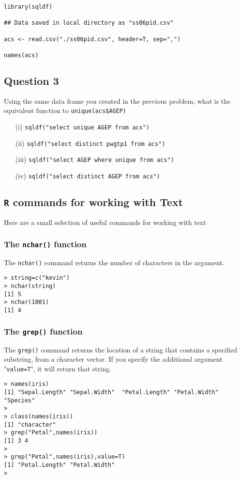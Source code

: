 \documentclass[12pt]{article}
\begin{document}
\begin{framed}
\begin{verbatim}
library(sqldf)

## Data saved in local directory as "ss06pid.csv"

acs <- read.csv("./ss06pid.csv", header=T, sep=",")

names(acs)
\end{verbatim}
\end{framed}
\newpage
\subsection*{Question 3}
Using the same data frame you created in the previous problem, what is the equivalent function to \texttt{unique(acs\$AGEP)}
\begin{itemize}
\item[(i)] \texttt{sqldf("select unique AGEP from acs")}
\item[(ii)] \texttt{sqldf("select distinct pwgtp1 from acs")}
\item[(iii)] \texttt{sqldf("select AGEP where unique from acs")}
\item[(iv)] \texttt{sqldf("select distinct AGEP from acs")}
\end{itemize}

\newpage
\subsection*{\texttt{R} commands for working with Text}

Here are a small selection of useful commands for working with text

\subsubsection*{The \texttt{nchar()} function}
The \texttt{nchar()} command returns the number of characters in the argument.
\begin{verbatim}
> string=c("kevin")
> nchar(string)
[1] 5
> nchar(1001)
[1] 4
\end{verbatim}

\subsubsection*{The \texttt{grep()} function}
The \texttt{grep()} command returns the location of a string that contains a specified substring, from a character vector.
If you specify the additional argument "\texttt{value=T}", it will return that string.
\begin{verbatim}
> names(iris)
[1] "Sepal.Length" "Sepal.Width"  "Petal.Length" "Petal.Width"  "Species"     
> 
> class(names(iris))
[1] "character"
> grep("Petal",names(iris))
[1] 3 4
> 
> grep("Petal",names(iris),value=T)
[1] "Petal.Length" "Petal.Width" 
> 
\end{verbatim}
\newpage
\end{document}

